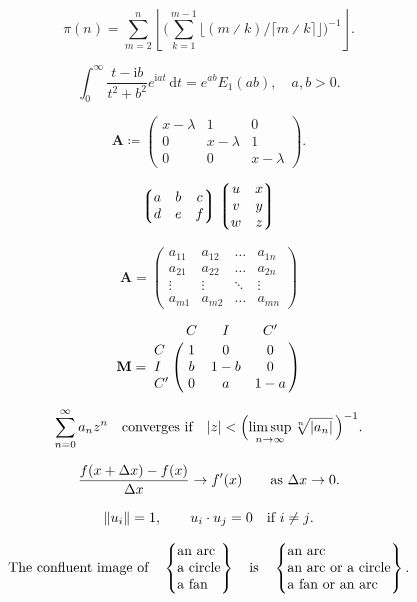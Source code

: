 

	$$\pi(n)=\sum_{m=2}^n\left\lfloor\Biggl(\sum_{k=1}^{m-1}\bigl
	\lfloor(m \divslash k) \big/ \lceil m \divslash k\rceil\bigr\rfloor\Biggr)^{-1}\right\rfloor.$$


	$$\int_0^\infty \frac{t - \mathup{i} b}{t^2 + b^2}e^{\mathup{i}at}\,\mathup{d}t=e^{ab}E_1(ab), \quad
	a,b > 0.$$


	$$\mathbf{A} \coloneq \begin{pmatrix}x-\lambda&1&0\\
	0&x-\lambda&1\\
	0&0&x-\lambda\end{pmatrix}.$$

	$$\left\lgroup\begin{matrix}a&b&c\\ d&e&f\\\end{matrix}\right\rgroup
	\left\lgroup\begin{matrix}u&x\cr v&y\cr w&z\end{matrix}\right\rgroup$$


	$$\mathbf{A} = \begin{pmatrix}a_{11}&a_{12}&\ldots&a_{1n}\\
	a_{21}&a_{22}&\ldots&a_{2n}\\
	\vdots&\vdots&\ddots&\vdots\\
	a_{m1}&a_{m2}&\ldots&a_{mn}\end{pmatrix}$$

	$$\mathbf{M}=\bordermatrix{&C&I&C'\cr
		C&1&0&0\cr I&b&1-b&0\cr C'&0&a&1-a}$$


	$$\sum_{n=0}^\infty a_nz^n\quad\hbox{converges if}\quad
	|z|<\Bigl(\limsup_{n\to\infty}\root n\of{|a_n|}\,\Bigr)^{-1}.$$

	$$\frac{f(x+\mathrm{\Delta} x)-f(x)}{\mathrm{\Delta} x}\to f'(x)
	\qquad \hbox{as $\mathrm{\Delta} x\to0$.}$$

	$$\|u_i\|=1,\qquad u_i\cdot u_j=0\quad\hbox{if $i\ne j$.}$$


	$$\hbox{The confluent image of}\quad
	\begin{Bmatrix}\hbox{an arc}\hfill\\\hbox{a circle}\hfill\\
	\hbox{a fan}\hfill\\\end{Bmatrix}
	\quad\hbox{is}\quad
	\begin{Bmatrix}\hbox{an arc}\hfill\\
	\hbox{an arc or a circle}\hfill\\
	\hbox{a fan or an arc}\hfill\end{Bmatrix}.$$

